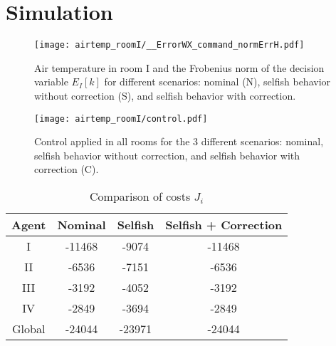 \documentclass{ifacconf}  %
\begin{document}



\section{Simulation}
\begin{figure}[h]
  \centering
 \texttt{[image: airtemp\_roomI/\_\_ErrorWX\_command\_normErrH.pdf]}
  \caption{Air temperature in room I and the Frobenius norm of the decision variable $E_{I}[k]$ for different scenarios: nominal (N), selfish behavior without correction (S),
and selfish behavior with correction.}\label{fig:response3Scenarios}
\end{figure}
\begin{figure}[h]
  \centering
 \texttt{[image: airtemp\_roomI/control.pdf]}
  \caption{Control applied in all rooms for the 3 different scenarios: nominal, selfish behavior without correction, and selfish behavior with correction (C).}\label{fig:response3Scenarios}
\end{figure}

\begin{table}[t]
  \centering
  \caption{Comparison of costs $J_{i}$}\label{tab:costsGlobalLocal}
  \begin{tabular}[t]{cccc} \toprule
    Agent  & Nominal & Selfish & Selfish + Correction\\
    \midrule
    I & -11468 &  -9074 & -11468 \\
    II & -6536 &  -7151 & -6536 \\
    III & -3192 &  -4052 & -3192 \\
    IV & -2849 &  -3694 & -2849 \\
    Global & -24044 &  -23971 & -24044 \\


    \bottomrule
  \end{tabular}
\end{table}
\end{document}
